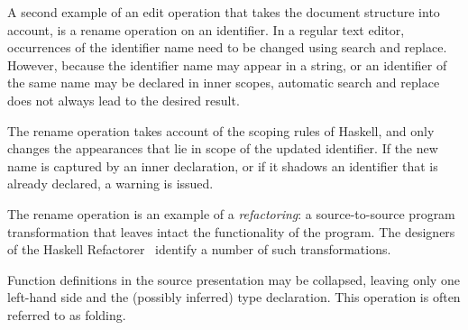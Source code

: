 
A second example of an edit operation that takes the document structure into account, is a rename operation on an identifier. In a regular text editor, occurrences of the identifier name need to be changed using search and replace. However, because the identifier name may appear in a string, or an identifier of the same name may be declared in inner scopes, automatic search and replace does not always lead to the desired result.


The rename operation takes account of the scoping rules of Haskell, and only changes the appearances that lie in scope of the updated identifier. If the new name is captured by an inner declaration, or if it shadows an identifier that is already declared, a warning is issued.

The rename operation is an example of a {\em refactoring}: a source-to-source program transformation that leaves intact the functionality of the program. The designers of the Haskell Refactorer~\cite{reinke03refactoring} identify a number of such transformations.


Function definitions in the source presentation may be collapsed, leaving only one left-hand side and the (possibly inferred) type declaration. This operation is often referred to as folding.

